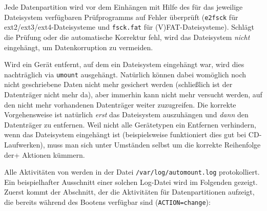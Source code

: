     Jede Datenpartition wird vor dem Einhängen mit Hilfe des für das jeweilige
    Dateisystem verfügbaren Prüfprogramms auf Fehler überprüft (\texttt{e2fsck}
    für ext2/ext3/ext4-Dateisysteme und \texttt{fsck.fat} für
    (V)FAT-Dateisysteme). Schlägt die Prüfung oder die automatische Korrektur
    fehl, wird das Dateisystem \emph{nicht} eingehängt, um Datenkorruption zu
    vermeiden.

    Wird ein Gerät entfernt, auf dem ein Dateisystem eingehängt war, wird dies
    nachträglich via \texttt{umount} ausgehängt. Natürlich können dabei
    womöglich noch nicht geschriebene Daten nicht mehr gesichert werden
    (schließlich ist der Datenträger nicht mehr da), aber immerhin kann nicht
    mehr versucht werden, auf den nicht mehr vorhandenen Datenträger weiter
    zuzugreifen. Die korrekte Vorgehensweise ist natürlich \emph{erst} das
    Dateisystem auszuhängen und \emph{dann} den Datenträger zu entfernen. Weil
    nicht alle Gerätetypen ein Entfernen verhindern, wenn das Dateisystem
    eingehängt ist (beispielsweise funktioniert dies gut bei CD-Laufwerken),
    muss man sich unter Umständen selbst um die korrekte Reihenfolge der+
    Aktionen kümmern.

    Alle Aktivitäten von  werden in der Datei
    \texttt{/var/log/automount.log} protokolliert. Ein beispielhafter
    Ausschnitt einer solchen Log-Datei wird im Folgenden gezeigt. Zuerst kommt
    der Abschnitt, der die Aktivitäten für Datenpartitionen aufzeigt, die
    bereits während des Bootens verfügbar sind (\texttt{ACTION=change}):

